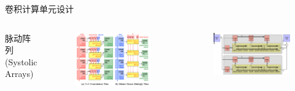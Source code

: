 \documentclass[10pt]{beamer}
\begin{document}
\begin{frame}{卷积计算单元设计}
\begin{columns}[T, onlytextwidth]
    \begin{center}
      \vspace{-0.5cm}
      {\small 脉动阵列 (Systolic Arrays) }
      \vspace{-0.5cm}
    \end{center}
    \begin{figure}
      \includegraphics[width=\textwidth]{img/cascade.png}
      \vspace{-0.5cm}
    \end{figure}

    \begin{figure}
      \includegraphics[width=\textwidth]{img/array}
    \end{figure}
    
  \end{columns}

\end{frame}
\end{document}
